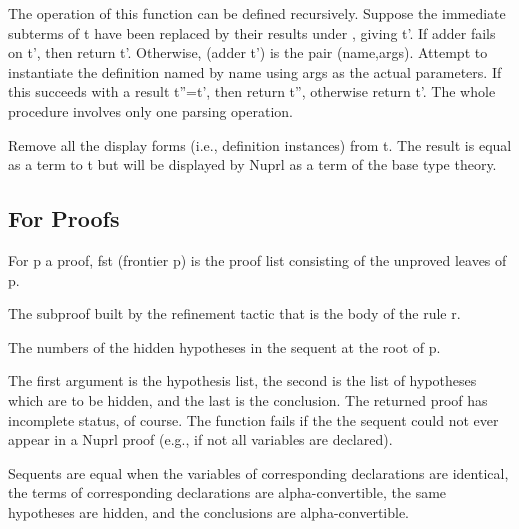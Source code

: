 The operation of this function can be defined recursively.  Suppose the
immediate subterms of t have been replaced by their results under
, giving t'.  If adder fails on t', then return
t'.  Otherwise, (adder t') is the pair (name,args).  Attempt to
instantiate the definition named by name using args as the actual
parameters.  If this succeeds with a result t''=t', then return t'',
otherwise return t'.  The whole procedure involves only one parsing
operation.

  Remove all the display forms
(i.e., definition instances) from t.  The result is equal as a term to t
but will be displayed by Nuprl as a term of the base type theory.


\subsection*{For Proofs}

  For p a proof, fst (frontier p) is the proof list
consisting of the unproved leaves of p.  

  The subproof built by the
refinement tactic that is the body of the rule r.

  The numbers of the hidden hypotheses in the
sequent at the root of p.

  The first
argument is the hypothesis list, the second is the list of hypotheses
which are to be hidden, and the last is the conclusion.  The returned
proof has incomplete status, of course.  The function fails if the the
sequent could not ever appear in a Nuprl proof (e.g., if not all
variables are declared).

  Sequents are equal when
the variables of corresponding declarations are identical, the terms of
corresponding declarations are alpha-convertible, the same hypotheses
are hidden, and the conclusions are alpha-convertible.








